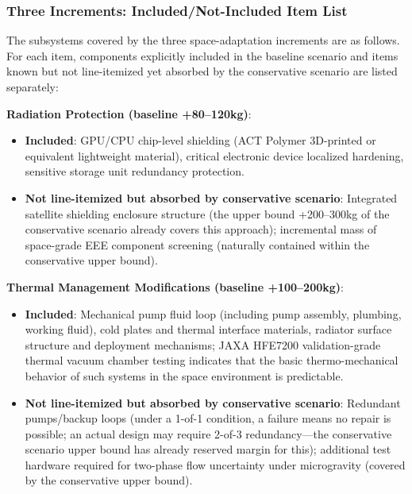 \subsubsection{Three Increments: Included/Not-Included Item List}

The subsystems covered by the three space-adaptation increments are as follows. For each item, components explicitly included in the baseline scenario and items known but not line-itemized yet absorbed by the conservative scenario are listed separately:

\medskip
\noindent\textbf{Radiation Protection (baseline +80--120\;kg)}:
\begin{itemize}[leftmargin=*]
    \item \textbf{Included}: GPU/CPU chip-level shielding (ACT Polymer 3D-printed or equivalent lightweight material), critical electronic device localized hardening, sensitive storage unit redundancy protection.
    \item \textbf{Not line-itemized but absorbed by conservative scenario}: Integrated satellite shielding enclosure structure (the upper bound +200--300\;kg of the conservative scenario already covers this approach); incremental mass of space-grade EEE component screening (naturally contained within the conservative upper bound).
\end{itemize}

\noindent\textbf{Thermal Management Modifications (baseline +100--200\;kg)}:
\begin{itemize}[leftmargin=*]
    \item \textbf{Included}: Mechanical pump fluid loop (including pump assembly, plumbing, working fluid), cold plates and thermal interface materials, radiator surface structure and deployment mechanisms; JAXA HFE7200 validation-grade thermal vacuum chamber testing indicates that the basic thermo-mechanical behavior of such systems in the space environment is predictable.
    \item \textbf{Not line-itemized but absorbed by conservative scenario}: Redundant pumps/backup loops (under a 1-of-1 condition, a failure means no repair is possible; an actual design may require 2-of-3 redundancy---the conservative scenario upper bound has already reserved margin for this); additional test hardware required for two-phase flow uncertainty under microgravity (covered by the conservative upper bound).
\end{itemize}

